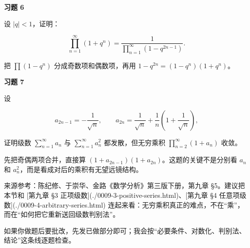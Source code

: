 \begin{exercisebox}
\textbf{习题 6 }

设 \(|q|<1\)，证明：

\[
        \prod_{n=1}^{\infty}(1+q^n)=\frac{1}{\prod_{n=1}^{\infty}(1-q^{2n-1})}.
      \]

\begin{hintbox}
把 \(\prod(1-q^n)\) 分成奇数项和偶数项，再用 \(1-q^{2n}=(1-q^n)(1+q^n)\)。
\end{hintbox}
\end{exercisebox}

\begin{exercisebox}
\textbf{习题 7 }

设

\[
        a_{2n-1}=-\frac1{\sqrt n},
        \qquad
        a_{2n}=\frac1{\sqrt n}+\frac1n\left(1+\frac1{\sqrt n}\right),
      \]

证明级数 \(\displaystyle\sum_{n=1}^{\infty}a_n\) 与 \(\displaystyle\sum_{n=1}^{\infty}a_n^2\) 都发散，但无穷乘积 \(\displaystyle\prod_{n=2}^{\infty}(1+a_n)\) 收敛。

\begin{hintbox}
先把奇偶两项合并，直接算 \((1+a_{2n-1})(1+a_{2n})\)。这题的关键不是分别看 \(a_n\) 和 \(a_n^2\)，而是看成对后的乘积有无望远镜结构。
\end{hintbox}
\end{exercisebox}

来源参考：陈纪修、于崇华、金路《数学分析》第三版下册，第九章 §5。建议把本节和 [第九章 §3 正项级数](./0009-3-positive-series.html)、[第九章 §4 任意项级数](./0009-4-arbitrary-series.html) 连起来看：无穷乘积真正的难点，不在“乘”，而在“如何把它重新送回级数判别法”。

如果你做题后要批改，先发已做部分即可；我会按“必要条件、对数化、判别法、结论”这条线逐题检查。
